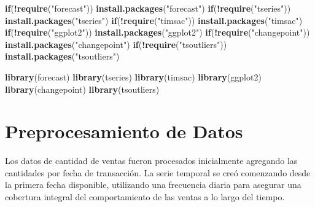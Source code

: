 \documentclass[
]{book}
\newenvironment{Shaded}{\begin{snugshade}}{\end{snugshade}}
\newcommand{\ControlFlowTok}[1]{\textcolor[rgb]{0.13,0.29,0.53}{\textbf{#1}}}
\newcommand{\FunctionTok}[1]{\textcolor[rgb]{0.13,0.29,0.53}{\textbf{#1}}}
\newcommand{\NormalTok}[1]{#1}
\newcommand{\SpecialCharTok}[1]{\textcolor[rgb]{0.81,0.36,0.00}{\textbf{#1}}}
\newcommand{\StringTok}[1]{\textcolor[rgb]{0.31,0.60,0.02}{#1}}
\begin{document}
\begin{Shaded}
\begin{Highlighting}[]
\ControlFlowTok{if}\NormalTok{(}\SpecialCharTok{!}\FunctionTok{require}\NormalTok{(}\StringTok{"forecast"}\NormalTok{)) }\FunctionTok{install.packages}\NormalTok{(}\StringTok{"forecast"}\NormalTok{)}
\ControlFlowTok{if}\NormalTok{(}\SpecialCharTok{!}\FunctionTok{require}\NormalTok{(}\StringTok{"tseries"}\NormalTok{)) }\FunctionTok{install.packages}\NormalTok{(}\StringTok{"tseries"}\NormalTok{)}
\ControlFlowTok{if}\NormalTok{(}\SpecialCharTok{!}\FunctionTok{require}\NormalTok{(}\StringTok{"timsac"}\NormalTok{)) }\FunctionTok{install.packages}\NormalTok{(}\StringTok{"timsac"}\NormalTok{)}
\ControlFlowTok{if}\NormalTok{(}\SpecialCharTok{!}\FunctionTok{require}\NormalTok{(}\StringTok{"ggplot2"}\NormalTok{)) }\FunctionTok{install.packages}\NormalTok{(}\StringTok{"ggplot2"}\NormalTok{)}
\ControlFlowTok{if}\NormalTok{(}\SpecialCharTok{!}\FunctionTok{require}\NormalTok{(}\StringTok{"changepoint"}\NormalTok{)) }\FunctionTok{install.packages}\NormalTok{(}\StringTok{"changepoint"}\NormalTok{)}
\ControlFlowTok{if}\NormalTok{(}\SpecialCharTok{!}\FunctionTok{require}\NormalTok{(}\StringTok{"tsoutliers"}\NormalTok{)) }\FunctionTok{install.packages}\NormalTok{(}\StringTok{"tsoutliers"}\NormalTok{)}

\FunctionTok{library}\NormalTok{(forecast)}
\FunctionTok{library}\NormalTok{(tseries)}
\FunctionTok{library}\NormalTok{(timsac)}
\FunctionTok{library}\NormalTok{(ggplot2)}
\FunctionTok{library}\NormalTok{(changepoint)}
\FunctionTok{library}\NormalTok{(tsoutliers)}
\end{Highlighting}
\end{Shaded}

\section{Preprocesamiento de Datos}\label{preprocesamiento-de-datos}

Los datos de cantidad de ventas fueron procesados inicialmente agregando las cantidades por fecha de transacción. La serie temporal se creó comenzando desde la primera fecha disponible, utilizando una frecuencia diaria para asegurar una cobertura integral del comportamiento de las ventas a lo largo del tiempo.
\end{document}
